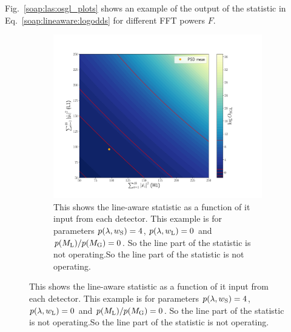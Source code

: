 Fig.~\ref{soap:las:osgl_plots} shows an example of the output of the statistic in Eq.~\ref{soap:lineaware:logodds} for different \gls{FFT} powers $F$.
\begin{figure}
\centering

\begin{subfigure}[h]{\linewidth}
\begin{minipage}{0.65\linewidth}
\includegraphics[width=1.\linewidth]{C3_soap/lookup_noline.pdf}
\end{minipage}\hfill
\begin{minipage}{0.35\linewidth}
\caption{This shows the line-aware statistic as a function of it input from each detector. This example is for parameters $p(\lambda,w_{\rm{S}}) = 4$, $p(\lambda,w_{\rm{L}}) = 0$ and $p(M_{\rm{L}})/p(M_{\rm{G}}) = 0$. So the line part of the statistic is not operating.So the line part of the statistic is not
operating.~}
\label{soap:las:detp:noline}
\end{minipage}
\end{subfigure}


\end{figure}
